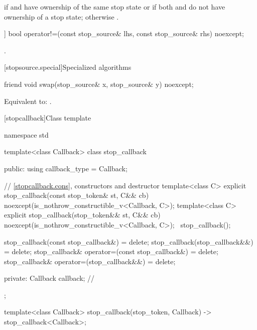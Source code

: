 \begin{itemdescr}
\pnum
\returns
{} if  and  have ownership
of the same stop state
or if both  and  do not have ownership of a stop state;
otherwise .
\end{itemdescr}

%
\begin{itemdecl}
[[nodiscard]] bool operator!=(const stop_source& lhs, const stop_source& rhs) noexcept;
\end{itemdecl}

\begin{itemdescr}
\pnum
\returns
{}.
\end{itemdescr}

[stopsource.special]{Specialized algorithms}

%
\begin{itemdecl}
friend void swap(stop_source& x, stop_source& y) noexcept;
\end{itemdecl}

\begin{itemdescr}
\pnum
\effects
Equivalent to: .
\end{itemdescr}

%
[stopcallback]{Class template }

\pnum
{}%
\begin{codeblock}
namespace std {
  template<class Callback>
  class stop_callback {
  public:
    using callback_type = Callback;

    // \ref{stopcallback.cons}, constructors and destructor
    template<class C>
    explicit stop_callback(const stop_token& st, C&& cb)
        noexcept(is_nothrow_constructible_v<Callback, C>);
    template<class C>
    explicit stop_callback(stop_token&& st, C&& cb)
        noexcept(is_nothrow_constructible_v<Callback, C>);
    ~stop_callback();

    stop_callback(const stop_callback&) = delete;
    stop_callback(stop_callback&&) = delete;
    stop_callback& operator=(const stop_callback&) = delete;
    stop_callback& operator=(stop_callback&&) = delete;

  private:
    Callback callback;      // \expos
  };

  template<class Callback>
  stop_callback(stop_token, Callback) -> stop_callback<Callback>;
}
\end{codeblock}

